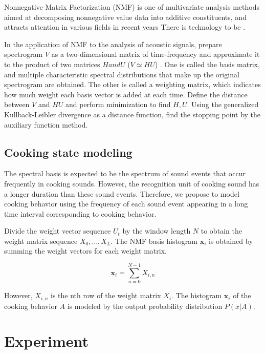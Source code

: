 \documentclass[sigchi]{acmart}
\begin{document}
Nonnegative Matrix Factorization (NMF) is one of multivariate analysis methods aimed at decomposing nonnegative value data into additive constituents, and attracts attention in various fields in recent years There is technology to be \cite{Lee1999}.

In the application of NMF to the analysis of acoustic signals, prepare spectrogram $ V $ as a two-dimensional matrix of time-frequency and approximate it to the product of two matrices $ H and U $ ($ V \simeq HU $) . One is called the basis matrix, and multiple characteristic spectral distributions that make up the original spectrogram are obtained. The other is called a weighting matrix, which indicates how much weight each basis vector is added at each time. Define the distance between $ V $ and $ HU $ and perform minimization to find $ H, U $.
Using the generalized Kullback-Leibler divergence as a distance function, find the stopping point by the auxiliary function method.

\subsection{Cooking state modeling}
The spectral basis is expected to be the spectrum of sound events that occur frequently in cooking sounds. However, the recognition unit of cooking sound has a longer duration than these sound events. Therefore, we propose to model cooking behavior using the frequency of each sound event appearing in a long time interval corresponding to cooking behavior.

Divide the weight vector sequence $ {U_t} $ by the window length $ N $ to obtain the weight matrix sequence $ X_0, \ldots, X_L $.
The NMF basis histogram $ \bm{x} _i $ is obtained by summing the weight vectors for each weight matrix.

\begin{equation}
\label{hist}
	\bm{x}_i = \sum_{n=0}^{N-1} X_{i, n}
\end{equation}

However, $ X_ {i, n} $ is the nth row of the weight matrix $ X_i $.
The histogram $ \bm {x} _i $ of the cooking behavior $ A $ is modeled by the output probability distribution $ P (x | A) $.

\section{Experiment}
\end{document}
